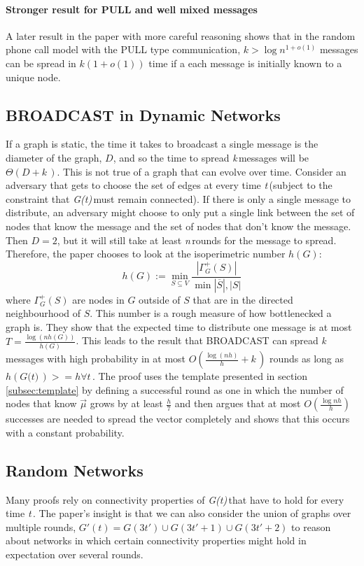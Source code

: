\documentclass{article} %
\def\numNodes{\textit{n}\,}
\def\graph{\textit{G(t)}\,}
\def\graphtime{\textit{t}\,}
\def\numMessages{\textit{k}\,}
\begin{document}
\paragraph{Stronger result for PULL and well mixed messages}
A later result in the paper with more careful reasoning shows that in the random phone call model with the PULL type communication, $k>\log{n}^{1+o(1)}$ messages can be spread in $k(1+o(1))$ time if a each message is initially known to a unique node.

\subsection{BROADCAST in Dynamic Networks}
If a graph is static, the time it takes to broadcast a single message is the diameter of the graph, $D$, and so the time to spread \numMessages messages will be $\Theta(D + \numMessages)$. This is not true of a graph that can evolve over time. Consider an adversary that gets to choose the set of edges at every time \graphtime (subject to the constraint that \graph must remain connected). If there is only a single message to distribute, an adversary might choose to only put a single link between the set of nodes that know the message and the set of nodes that don't know the message. Then $D=2$, but it will still take at least \numNodes rounds for the message to spread. Therefore, the paper chooses to look at the isoperimetric number $h(G)$:
\begin{equation}
h(G) := \min\limits_{S \subseteq V}{\frac{|\Gamma^{+}_G(S)|}{\min{|\overline{S}|,|S|}}}
\end{equation} 
where $\Gamma^{+}_G(S)$ are nodes in $G$ outside of $S$ that are in the directed neighbourhood of $S$. This number is a rough measure of how bottlenecked a graph is. They show that the expected time to distribute one message is at most $T=\frac{\log{(nh(G))}}{h(G)}$. This leads to the result that BROADCAST can spread \numMessages messages with high probability in at most $O(\frac{\log{(nh)}}{h} + \numMessages)$ rounds as long as $h(\graph) >= h \forall \graphtime$. The proof uses the template presented in section \ref{subsec:template} by defining a successful round as one in which the number of nodes that know $\vec{\mu}$ grows by at least $\frac{h}{7}$ and then argues that at most $O(\frac{\log{nh}}{h})$ successes are needed to spread the vector completely and shows that this occurs with a constant probability. 

\subsection{Random Networks}
Many proofs rely on connectivity properties of \graph that have to hold for every time \graphtime. The paper's insight is that we can also consider the union of graphs over multiple rounds, $G'(t) = G(3t') \cup G(3t'+1) \cup G(3t'+2)$ to reason about networks in which certain connectivity properties might hold in expectation over several rounds.
\end{document}

